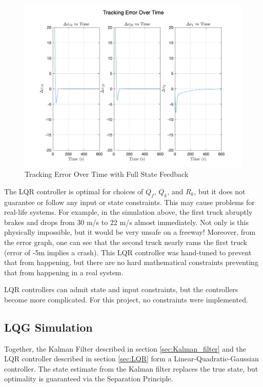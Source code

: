 \documentclass[12pt,onecolumn,reqno]{amsart}
\begin{document}
\begin{figure}[H]
	\includegraphics[width=\linewidth]{tracking_error_over_time_with_truth.jpg}
	\caption{Tracking Error Over Time with Full State Feedback}
\end{figure}

The LQR controller is optimal for choices of $Q_f$, $Q_k$, and $R_k$, but it
does not guarantee or follow any input or state constraints. This may cause
problems for real-life systems. For example, in the simulation above, the first
truck abruptly brakes and drops from 30 m/s to 22 m/s almost immediately. Not
only is this physically impossible, but it would be very unsafe on a freeway!
Moreover, from the error graph, one can see that the second truck nearly rams
the first truck (error of -5m implies a crash). This LQR controller was
hand-tuned to prevent that from happening, but there are no hard mathematical
constraints preventing that from happening in a real system.

LQR controllers can admit state and input constraints, but the controllers
become more complicated. For this project, no constraints were implemented.


\subsection{LQG Simulation}
Together, the Kalman Filter described in section \ref{sec:Kalman_filter} and the
LQR controller described in section \ref{sec:LQR} form a Linear-Quadratic-Gaussian
controller. The state estimate from the Kalman filter replaces the true state,
but optimality is guaranteed via the Separation Principle.
\end{document}
